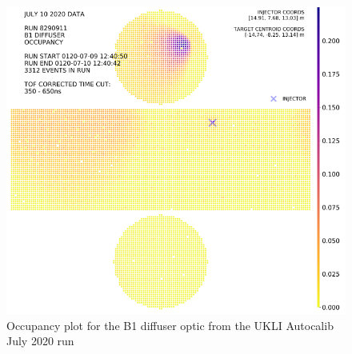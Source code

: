 \begin{figure}
\begin{minipage}{0.47\textwidth}
        \includegraphics[width=\textwidth]{Figures/B1_occupancy_diff_auto.PNG} %
        \caption{Occupancy plot for the B1 diffuser optic from the UKLI Autocalib July 2020 run}
        \label{fig:B1_diff_auto_July}
    \end{minipage}
\end{figure}


